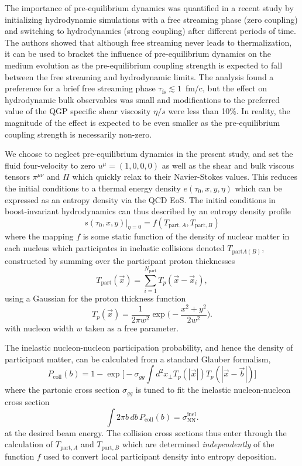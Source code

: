 \documentclass[aps,prc,reprint,amsmath,nofootinbib]{revtex4-1}
\newcommand{\TA}{T_{\text{part},A}}
\newcommand{\TB}{T_{\text{part},B}}
\begin{document}
The importance of pre-equilibrium dynamics was quantified in a recent study by initializing hydrodynamic simulations with a free streaming phase (zero coupling) and switching to hydrodynamics (strong coupling) after different periods of time. The authors showed that although free streaming never leads to thermalization, it can be used to bracket the influence of pre-equilibrium dynamics on the medium evolution as the pre-equilibrium coupling strength is expected to fall between the free streaming and hydrodynamic limits. The analysis found a preference for a brief free streaming phase ${\tau_\text{fs} \lesssim 1}$~fm/c, but the effect on hydrodynamic bulk observables was small and modifications to the preferred value of the QGP specific shear viscosity $\eta/s$ were less than 10\%. In reality, the magnitude of the effect is expected to be even smaller as the pre-equilibrium coupling strength is necessarily non-zero.

We choose to neglect pre-equilibrium dynamics in the present study, and set the fluid four-velocity to zero ${u^\mu = (1,0,0,0)}$ as well as the shear and bulk viscous tensors $\pi^{\mu\nu}$ and $\Pi$ which quickly relax to their Navier-Stokes values. This reduces the initial conditions to a thermal energy density $e(\tau_0, x, y, \eta)$ which can be expressed as an entropy density via the QCD EoS. The initial conditions in boost-invariant hydrodynamics can thus described by an entropy density profile
\begin{equation}
    \label{mapping}
    s(\tau_0, x, y)\vert_{\eta=0} = f(\TA, \TB)
\end{equation}
where the mapping $f$ is some static function of the density of nuclear matter in each nucleus which participates in inelastic collisions denoted $T_{\text{part}A(B)}$, constructed by summing over the participant proton thicknesses
\begin{equation}
    T_{\text{part}}(\vec{x}) = \sum\limits_{i=1}^{N_\text{part}} T_p(\vec{x} - \vec{x}_i),
\end{equation}
using a Gaussian for the proton thickness function
\begin{equation}
    T_p(\vec{x}) = \frac{1}{2\pi w^2} \exp\bigg(\!-\frac{x^2 + y^2}{2 w^2}\bigg). 
\end{equation}    
with nucleon width $w$ taken as a free parameter.

The inelastic nucleon-nucleon participation probability, and hence the density of participant matter, can be calculated from a standard Glauber formalism,
\begin{equation}
    P_\text{coll}(b) = 1 - \exp \bigg[ -\sigma_{gg} \int d^2x_\perp T_p(|\vec{x}|) T_p(|\vec{x} - \vec{b}|) \bigg ] 
\end{equation}
where the partonic cross section $\sigma_{gg}$ is tuned to fit the inelastic nucleon-nucleon cross section
\begin{equation}
    \int 2 \pi b\, db\, P_\text{coll}(b) = \sigma_\text{NN}^\text{inel}. 
\end{equation}
at the desired beam energy. The collision cross sections thus enter through the calculation of $\TA$ and $\TB$ which are determined \emph{independently} of the function $f$ used to convert local participant density into entropy deposition.
\end{document}
